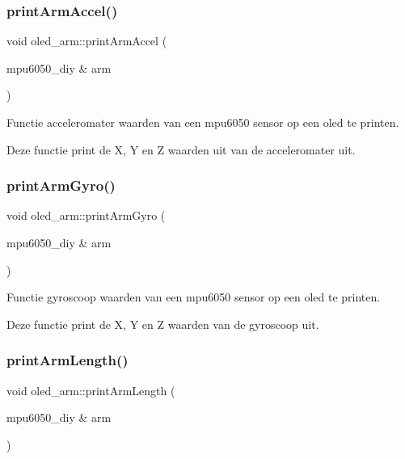 \subsubsection{\texorpdfstring{print\+Arm\+Accel()}{printArmAccel()}}
{\footnotesize\ttfamily void oled\+\_\+arm\+::print\+Arm\+Accel (\begin{DoxyParamCaption}\item[{mpu6050\+\_\+diy \&}]{arm }\end{DoxyParamCaption})\hspace{0.3cm}{\ttfamily [inline]}}



Functie acceleromater waarden van een mpu6050 sensor op een oled te printen. 

Deze functie print de X, Y en Z waarden uit van de acceleromater uit. \mbox{\label{classoled__arm_a35bcedc3e023c1744420fdc377ca980c}} 
\subsubsection{\texorpdfstring{print\+Arm\+Gyro()}{printArmGyro()}}
{\footnotesize\ttfamily void oled\+\_\+arm\+::print\+Arm\+Gyro (\begin{DoxyParamCaption}\item[{mpu6050\+\_\+diy \&}]{arm }\end{DoxyParamCaption})\hspace{0.3cm}{\ttfamily [inline]}}



Functie gyroscoop waarden van een mpu6050 sensor op een oled te printen. 

Deze functie print de X, Y en Z waarden van de gyroscoop uit. \mbox{\label{classoled__arm_a4bb3a852d58e7febdf07d7342199813a}} 
\subsubsection{\texorpdfstring{print\+Arm\+Length()}{printArmLength()}}
{\footnotesize\ttfamily void oled\+\_\+arm\+::print\+Arm\+Length (\begin{DoxyParamCaption}\item[{mpu6050\+\_\+diy \&}]{arm }\end{DoxyParamCaption})\hspace{0.3cm}{\ttfamily [inline]}}



